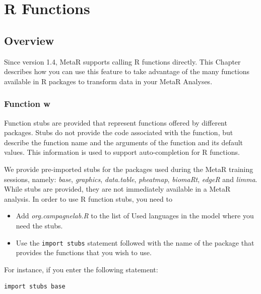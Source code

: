


\chapter{R Functions}\label{chap:RFunctions}

\section{Overview}
Since version 1.4, MetaR supports calling R functions directly. This Chapter describes how you can use this feature to take advantage of the many functions available in R packages to transform data in your MetaR Analyses. 

\subsection{Function w}
Function stubs are provided that represent functions offered by different packages. Stubs do not provide the code associated with the function, but describe the function name and the arguments of the function and its default values. This information is used to support auto-completion for R functions. 

We provide pre-imported stubs for the packages used during the MetaR training sessions, namely: \textit{base}, \textit{graphics}, \textit{data.table}, \textit{pheatmap}, \textit{biomaRt}, \textit{edgeR} and \textit{limma}. While stubs are provided, they are not immediately available in a MetaR analysis. In order to use R function stubs, you need to 
\begin{itemize}
  \item Add \textit{org.campagnelab.R} to the list of Used languages in the model where you need the stubs.
  \item Use the \texttt{import stubs} statement followed with the name of the package that provides the functions that you wish to use.
\end{itemize}

\noindent{}For instance, if you enter the following statement: 
\begin{lstlisting}
import stubs base
\end{lstlisting}

